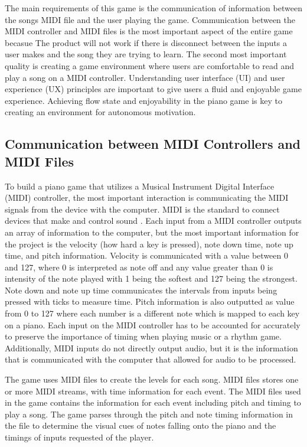 \documentclass[10pt,twocolumn]{article}
\begin{document}
The main requirements of this game is the communication of information between the songs MIDI file and the user playing the game. Communication between the MIDI controller and MIDI files is the most important aspect of the entire game becasue The product will not work if there is disconnect between the inputs a user makes and the song they are trying to learn. The second most important quality is creating a game environment where users are comfortable to read and play a song on a MIDI controller. Understanding user interface (UI) and user experience (UX) principles are important to give users a fluid and enjoyable game experience. Achieving flow state and enjoyability in the piano game \cite{Wagner} is key to creating an environment for autonomous motivation. 

\subsection{Communication between MIDI Controllers and MIDI Files}

To build a piano game that utilizes a Musical Instrument Digital Interface (MIDI) controller, the most important interaction is communicating the MIDI signals from the device with the computer. MIDI is the standard to connect devices that make and control sound \cite{MIDIStandard}. Each input from a MIDI controller outputs an array of information to the computer, but the most important information for the project is the velocity (how hard a key is pressed), note down time, note up time, and pitch information. Velocity is communicated with a value between 0 and 127, where 0 is interpreted as note off and any value greater than 0 is intensity of the note played with 1 being the softest and 127 being the strongest. Note down and note up time communicates the intervals from inputs being pressed with ticks to measure time. Pitch information is also outputted as value from 0 to 127 where each number is a different note which is mapped to each key on a piano. Each input on the MIDI controller has to be accounted for accurately to preserve the importance of timing when playing music or a rhythm game. Additionally, MIDI inputs do not directly output audio, but it is the information that is communicated with the computer that allowed for audio to be processed. 

The game uses MIDI files to create the levels for each song. MIDI files stores one or more MIDI streams, with time information for each event. The MIDI files used in the game contains the information for each event including pitch and timing to play a song. The game parses through the pitch and note timing information in the file to determine the visual cues of notes falling onto the piano and the timings of inputs requested of the player.
\end{document}
